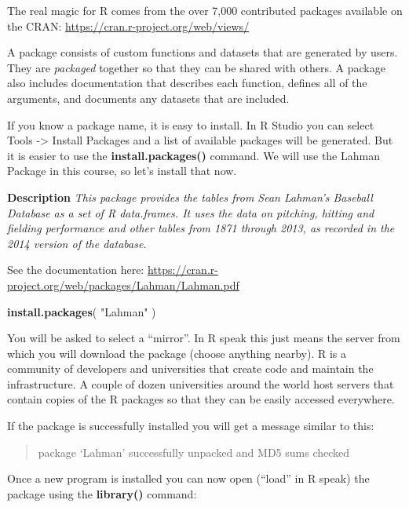 \documentclass[]{book}
\newenvironment{Shaded}{\begin{snugshade}}{\end{snugshade}}
\newcommand{\KeywordTok}[1]{\textcolor[rgb]{0.13,0.29,0.53}{\textbf{#1}}}
\newcommand{\NormalTok}[1]{#1}
\newcommand{\StringTok}[1]{\textcolor[rgb]{0.31,0.60,0.02}{#1}}
\theoremstyle{definition}
\theoremstyle{definition}
\theoremstyle{definition}
\theoremstyle{remark}
\begin{document}
The real magic for R comes from the over 7,000 contributed packages
available on the CRAN: \url{https://cran.r-project.org/web/views/}

A package consists of custom functions and datasets that are generated
by users. They are \emph{packaged} together so that they can be shared
with others. A package also includes documentation that describes each
function, defines all of the arguments, and documents any datasets that
are included.

If you know a package name, it is easy to install. In R Studio you can
select Tools -\textgreater{} Install Packages and a list of available
packages will be generated. But it is easier to use the
\textbf{install.packages()} command. We will use the Lahman Package in
this course, so let's install that now.

\textbf{Description} \emph{This package provides the tables from Sean
Lahman's Baseball Database as a set of R data.frames. It uses the data
on pitching, hitting and fielding performance and other tables from 1871
through 2013, as recorded in the 2014 version of the database.}

See the documentation here:
\url{https://cran.r-project.org/web/packages/Lahman/Lahman.pdf}

\begin{Shaded}
\begin{Highlighting}[]

\KeywordTok{install.packages}\NormalTok{( }\StringTok{"Lahman"}\NormalTok{ )}
\end{Highlighting}
\end{Shaded}

You will be asked to select a ``mirror''. In R speak this just means the
server from which you will download the package (choose anything
nearby). R is a community of developers and universities that create
code and maintain the infrastructure. A couple of dozen universities
around the world host servers that contain copies of the R packages so
that they can be easily accessed everywhere.

If the package is successfully installed you will get a message similar
to this:

\begin{quote}
package `Lahman' successfully unpacked and MD5 sums checked
\end{quote}

Once a new program is installed you can now open (``load'' in R speak)
the package using the \textbf{library()} command:
\end{document}
